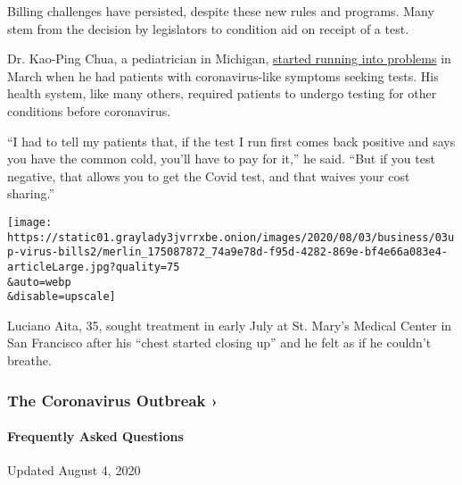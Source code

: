 Billing challenges have persisted, despite these new rules and programs.
Many stem from the decision by legislators to condition aid on receipt
of a test.

Dr. Kao-Ping Chua, a pediatrician in Michigan,
\href{https://www.healthaffairs.org/do/10.1377/hblog20200413.783118/full/}{started
running into problems} in March when he had patients with
coronavirus-like symptoms seeking tests. His health system, like many
others, required patients to undergo testing for other conditions before
coronavirus.

``I had to tell my patients that, if the test I run first comes back
positive and says you have the common cold, you'll have to pay for it,''
he said. ``But if you test negative, that allows you to get the Covid
test, and that waives your cost sharing.''

\texttt{[image: https://static01.graylady3jvrrxbe.onion/images/2020/08/03/business/03up-virus-bills2/merlin\_175087872\_74a9e78d-f95d-4282-869e-bf4e66a083e4-articleLarge.jpg?quality=75\\\&auto=webp\\\&disable=upscale]}

Luciano Aita, 35, sought treatment in early July at St. Mary's Medical
Center in San Francisco after his ``chest started closing up'' and he
felt as if he couldn't breathe.

\href{https://www.nytimes3xbfgragh.onion/news-event/coronavirus?action=click\&pgtype=Article\&state=default\&region=MAIN_CONTENT_3\&context=storylines_faq}{}

\hypertarget{the-coronavirus-outbreak-}{%
\subsubsection{The Coronavirus Outbreak
›}\label{the-coronavirus-outbreak-}}

\hypertarget{frequently-asked-questions}{%
\paragraph{Frequently Asked
Questions}\label{frequently-asked-questions}}

Updated August 4, 2020


